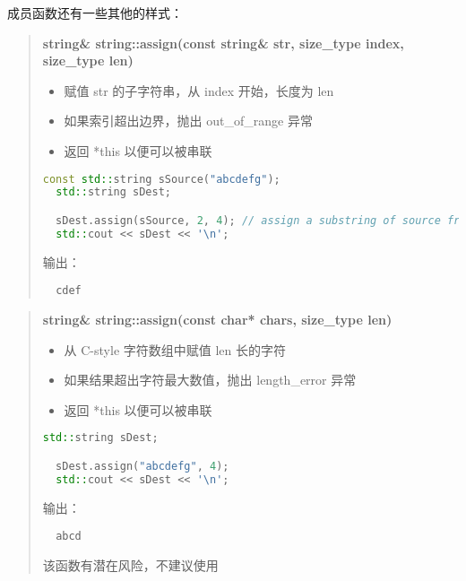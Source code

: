 \documentclass[../../LearnCpp.tex]{subfiles}
\begin{document}
 成员函数还有一些其他的样式：

\begin{quotation}
  \textbf{string\& string::assign(const string\& str, size\_type index, size\_type len)}

  \begin{itemize}
    \item 赋值 str 的子字符串，从 index 开始，长度为 len
    \item 如果索引超出边界，抛出 out\_of\_range 异常
    \item 返回 *this 以便可以被串联
  \end{itemize}

  \begin{lstlisting}[language=C++]
  const std::string sSource("abcdefg");
  std::string sDest;

  sDest.assign(sSource, 2, 4); // assign a substring of source from index 2 of length 4
  std::cout << sDest << '\n';
  \end{lstlisting}

  输出：

  \begin{lstlisting}
  cdef
  \end{lstlisting}
\end{quotation}

\begin{quotation}
  \textbf{string\& string::assign(const char* chars, size\_type len)}

  \begin{itemize}
    \item 从 C-style 字符数组中赋值 len 长的字符
    \item 如果结果超出字符最大数值，抛出 length\_error 异常
    \item 返回 *this 以便可以被串联
  \end{itemize}

  \begin{lstlisting}[language=C++]
  std::string sDest;

  sDest.assign("abcdefg", 4);
  std::cout << sDest << '\n';
  \end{lstlisting}

  输出：

  \begin{lstlisting}
  abcd
  \end{lstlisting}

  该函数有潜在风险，不建议使用
\end{quotation}
\end{document}
